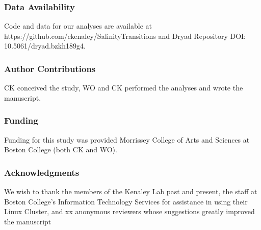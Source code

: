 \documentclass[11pt]{article}
\begin{document}
\subsubsection*{Data Availability}
Code and data for our analyses are available at https://github.com/ckenaley/SalinityTransitions and Dryad Repository DOI: 10.5061/dryad.bzkh189g4.

\subsubsection*{Author Contributions}
CK  conceived the study, WO and CK performed the analyses and wrote the manuscript.

\subsubsection*{Funding}
Funding for this study was provided Morrissey College of Arts and Sciences at Boston College (both CK and WO).

\subsubsection*{Acknowledgments}
We wish to thank the members of the Kenaley Lab past and present, the staff at Boston College's Information Technology Services for assistance in using their Linux Cluster, and xx anonymous reviewers whose suggestions greatly improved the manuscript














\end{document}
